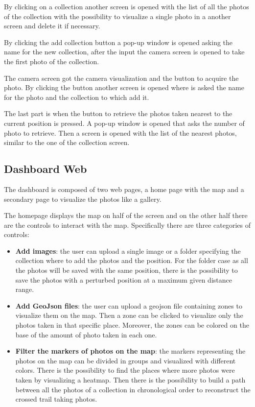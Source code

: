 \documentclass[conference]{IEEEtran}
\begin{document}
\medskip

By clicking on a collection another screen is opened with the list of all the photos of the collection with the possibility to visualize a single photo in a another screen and delete it if necessary.

\medskip

By clicking the add collection button a pop-up window is opened asking the name for the new collection, after the input the camera screen is opened to take the first photo of the collection.

\medskip

The camera screen got the camera visualization and the button to acquire the photo. By clicking the button another screen is opened where is asked the name for the photo and the collection to which add it.

\medskip

The last part is when the button to retrieve the photos taken nearest to the current position is pressed. A pop-up window is opened that asks the number of photo to retrieve. Then a screen is opened with the list of the nearest photos, similar to the one of the collection screen. 

\subsection{Dashboard Web}
The dashboard is composed of two web pages, a home page with the map and a secondary page to visualize the photos like a gallery. 

\medskip

The homepage displays the map on half of the screen and on the other half there are the controls to interact with the map. Specifically there are three categories of controls: \begin{itemize}
\item \textbf{Add images}: the user can upload a single image or a folder specifying the collection where to add the photos and the position. For the folder case as all the photos will be saved with the same position, there is the possibility to save the photos with a perturbed position at a maximum given distance range.   
\item \textbf{Add GeoJson files}: the user can upload a geojson file containing zones to visualize them on the map. Then a zone can be clicked to visualize only the photos taken in that specific place. Moreover, the zones can be colored on the base of the amount of photo taken in each one. 
\item \textbf{Filter the markers of photos on the map}: the markers representing the photos on the map can be divided in groups and visualized with different colors. There is the possibility to find the places where more photos were taken by visualizing a heatmap. Then there is the possibility to build a path between all the photos of a collection in chronological order to reconstruct the crossed trail taking photos.    
\end{itemize}
\end{document}
